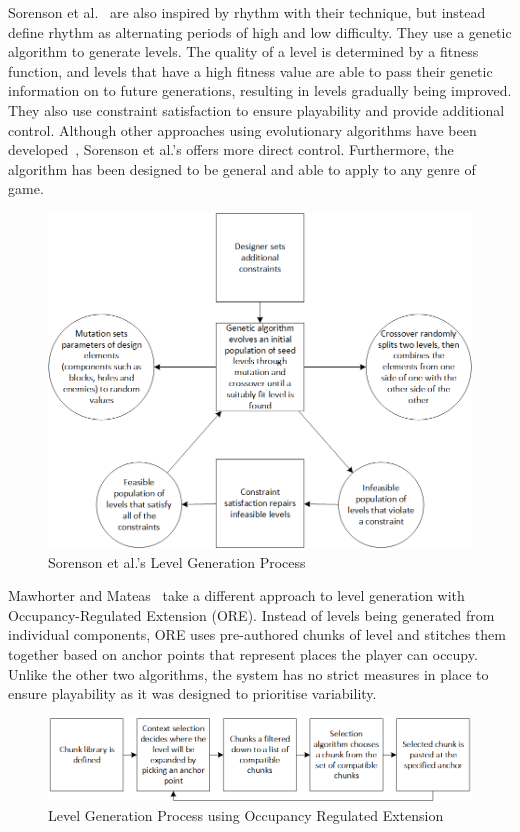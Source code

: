 \documentclass{scrartcl}
\begin{document}
Sorenson et al.~\cite{sorenson:generic} are also inspired by rhythm with their technique, but instead define rhythm as alternating periods of high and low difficulty. They use a genetic algorithm to generate levels. The quality of a level is determined by a fitness function, and levels that have a high fitness value are able to pass their genetic information on to future generations, resulting in levels gradually being improved. They also use constraint satisfaction to ensure playability and provide additional control. Although other approaches using evolutionary algorithms have been developed~\cite{mourato:genetic}, Sorenson et al.'s offers more direct control. Furthermore, the algorithm has been designed to be general and able to apply to any genre of game.
\begin{figure}[h]
\includegraphics[width=\textwidth]{figs/genetic.png}
\caption{Sorenson et al.'s Level Generation Process}
\end{figure}


Mawhorter and Mateas~\cite{mawhorter:occupancy} take a different approach to level generation with Occupancy-Regulated Extension (ORE). Instead of levels being generated from individual components, ORE uses pre-authored chunks of level and stitches them together based on anchor points that represent places the player can occupy. Unlike the other two algorithms, the system has no strict measures in place to ensure playability as it was designed to prioritise variability.

\begin{figure}[h]
\includegraphics[width=\textwidth]{figs/ore.png}
\caption{Level Generation Process using Occupancy Regulated Extension}
\end{figure}
\end{document}
